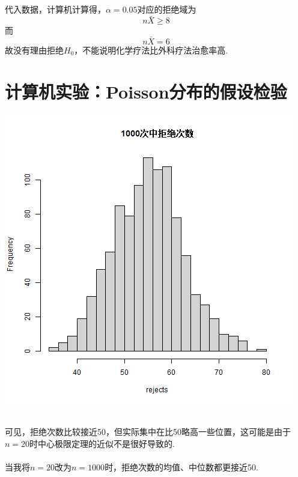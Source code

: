 \documentclass{article}
\begin{document}
\begin{CJK}{UTF8}{gbsn}
\subsection{}
代入数据，计算机计算得，$\alpha=0.05$对应的拒绝域为
$$ n\bar{X}\geq 8 $$
而
$$ n\bar{X}=6 $$
故没有理由拒绝$H_{0}$，不能说明化学疗法比外科疗法治愈率高.
\section{计算机实验：Poisson分布的假设检验}
\begin{minipage}{0.5\textwidth}
    \includegraphics[scale=0.6]{poisson_check.png}
\end{minipage}
\\
可见，拒绝次数比较接近50，但实际集中在比50略高一些位置，这可能是由于$n=20$时中心极限定理的近似不是很好导致的.
\\\\
当我将$n=20$改为$n=1000$时，拒绝次数的均值、中位数都更接近50.\\
\begin{minipage}{0.5\textwidth}

\end{minipage}
\end{CJK}
\end{document}
